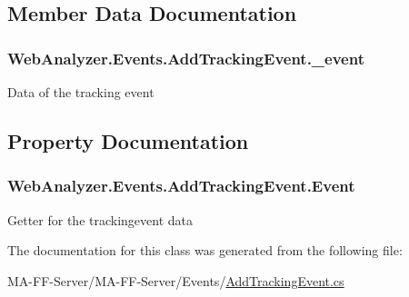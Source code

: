 \subsection{Member Data Documentation}
\hypertarget{class_web_analyzer_1_1_events_1_1_add_tracking_event_ae4254416e365751f3187a64e68ff4fc2}{}
\subsubsection[{\+\_\+event}]{ Web\+Analyzer.\+Events.\+Add\+Tracking\+Event.\+\_\+event\hspace{0.3cm}{\ttfamily [private]}}\label{class_web_analyzer_1_1_events_1_1_add_tracking_event_ae4254416e365751f3187a64e68ff4fc2}


Data of the tracking event 



\subsection{Property Documentation}
\hypertarget{class_web_analyzer_1_1_events_1_1_add_tracking_event_aac855bc1f8abb62af8501d10be516dd2}{}
\subsubsection[{Event}]{ Web\+Analyzer.\+Events.\+Add\+Tracking\+Event.\+Event\hspace{0.3cm}{\ttfamily [get]}}\label{class_web_analyzer_1_1_events_1_1_add_tracking_event_aac855bc1f8abb62af8501d10be516dd2}


Getter for the trackingevent data 



The documentation for this class was generated from the following file\+:\begin{DoxyCompactItemize}
\item 
M\+A-\/\+F\+F-\/\+Server/\+M\+A-\/\+F\+F-\/\+Server/\+Events/\hyperlink{_add_tracking_event_8cs}{Add\+Tracking\+Event.\+cs}\end{DoxyCompactItemize}
